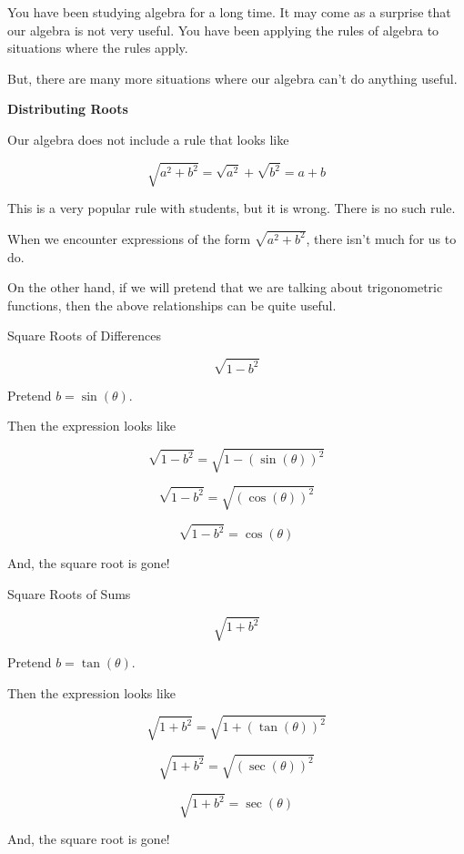 \documentclass{ximera}
\begin{document}
You have been studying algebra for a long time.  It may come as a surprise that our algebra is not very useful.  You have been applying the rules of algebra to situations where the rules apply. 


But, there are many more situations where our algebra can't do anything useful. 



\textbf{Distributing Roots}


Our algebra does not include a rule that looks like  

\[
\sqrt{a^2 + b^2} = \sqrt{a^2} + \sqrt{b^2} = a + b
\]


This is a very popular rule with students, but it is wrong.  There is no such rule. 


When we encounter expressions of the form $\sqrt{a^2 + b^2}$, there isn't much for us to do. 



On the other hand, if we will pretend that we are talking about trigonometric functions, then the above relationships can be quite useful. 




\begin{example} Square Roots of Differences


\[
\sqrt{1 - b^2} 
\]


Pretend $b = \sin(\theta)$. 

Then the expression looks like

\[
\sqrt{1 - b^2} = \sqrt{1 - (\sin(\theta))^2}
\]


\[
\sqrt{1 - b^2} = \sqrt{(\cos(\theta))^2}
\]


\[
\sqrt{1 - b^2} = \cos(\theta)
\]



And, the square root is gone! 





\end{example}










\begin{example} Square Roots of Sums


\[
\sqrt{1 + b^2} 
\]


Pretend $b = \tan(\theta)$. 

Then the expression looks like

\[
\sqrt{1 + b^2} = \sqrt{1 + (\tan(\theta))^2}
\]


\[
\sqrt{1 + b^2} = \sqrt{(\sec(\theta))^2}
\]


\[
\sqrt{1 + b^2} = \sec(\theta)
\]



And, the square root is gone! 




\end{example}
\end{document}
